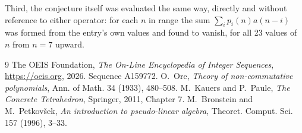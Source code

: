 \documentclass[11pt,a4paper]{article}
\theoremstyle{plain}
\theoremstyle{definition}
\begin{document}
Third, the conjecture itself was evaluated the same way, directly and without reference to
either operator: for each $n$ in range the sum $\sum_{i}p_{i}(n)a(n-i)$ was formed from the
entry's own values and found to vanish, for all 23 values of $n$ from
$n=7$ upward.

\begin{thebibliography}{9}
 The OEIS Foundation, \emph{The On-Line Encyclopedia of Integer Sequences},
\url{https://oeis.org}, 2026. Sequence A159772.
 O.~Ore, \emph{Theory of non-commutative polynomials}, Ann. of Math. 34
(1933), 480--508.
 M.~Kauers and P.~Paule, \emph{The Concrete Tetrahedron}, Springer, 2011,
Chapter 7.
 M.~Bronstein and M.~Petkov\v{s}ek, \emph{An introduction to
pseudo-linear algebra}, Theoret. Comput. Sci. 157 (1996), 3--33.
\end{thebibliography}
\end{document}
